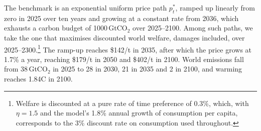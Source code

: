 \documentclass[12pt,english]{article}
\theoremstyle{remark}
\begin{document}
The benchmark is an exponential uniform price path $p^*_t$, ramped up linearly from zero in 2025 over ten years and growing at a constant rate from 2036, which exhausts a carbon budget of 1000\,GtCO$_2$ over 2025--2100. Among such paths, we take the one that maximises discounted world welfare, damages included, over 2025--2300.\footnote{Welfare is discounted at a pure rate of time preference of 0.3\%, which, with $\eta=1.5$ and the model's 1.8\% annual growth of consumption per capita, corresponds to the 3\% discount rate on consumption used throughout.} The ramp-up reaches \$142/t in 2035, after which the price grows at 1.7\% a year, reaching \$179/t in 2050 and \$402/t in 2100. World emissions fall from 38\,GtCO$_2$ in 2025 to 28 in 2030, 21 in 2035 and 2 in 2100, and warming reaches 1.84\textdegree C in 2100.
\end{document}
